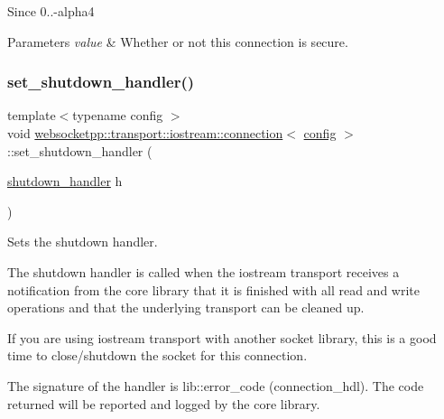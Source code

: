 \begin{DoxySince}{Since}
0..-\/alpha4
\end{DoxySince}

\begin{DoxyParams}{Parameters}
{\em value} & Whether or not this connection is secure. \\
\hline
\end{DoxyParams}
\mbox{\label{classwebsocketpp_1_1transport_1_1iostream_1_1connection_a37bb9ef90b3d183c238a32cf9f056d4b}} 
\subsubsection{\texorpdfstring{set\+\_\+shutdown\+\_\+handler()}{set\_shutdown\_handler()}}
{\footnotesize\ttfamily template$<$typename config $>$ \\
void \mbox{\hyperlink{classwebsocketpp_1_1transport_1_1iostream_1_1connection}{websocketpp\+::transport\+::iostream\+::connection}}$<$ \mbox{\hyperlink{classconfig}{config}} $>$\+::set\+\_\+shutdown\+\_\+handler (\begin{DoxyParamCaption}\item[{\mbox{\hyperlink{namespacewebsocketpp_1_1transport_1_1iostream_a3563ce2cca06b1466f7d76ecb8eb4a0b}{shutdown\+\_\+handler}}}]{h }\end{DoxyParamCaption})\hspace{0.3cm}{\ttfamily [inline]}}



Sets the shutdown handler. 

The shutdown handler is called when the iostream transport receives a notification from the core library that it is finished with all read and write operations and that the underlying transport can be cleaned up.

If you are using iostream transport with another socket library, this is a good time to close/shutdown the socket for this connection.

The signature of the handler is {\ttfamily lib\+::error\+\_\+code (connection\+\_\+hdl)}. The code returned will be reported and logged by the core library.

